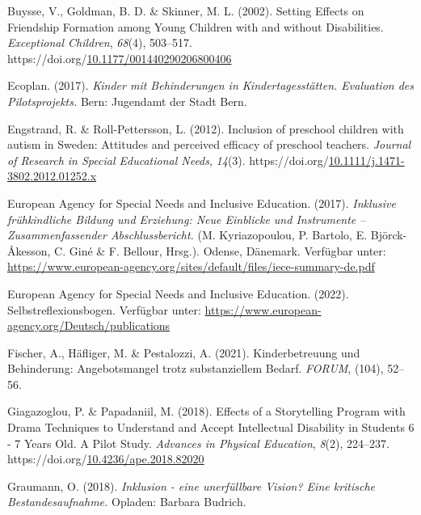 \documentclass[
  ngerman,
  11pt,
  paper=a4,
  twoside,
  titlepage=true,
  openright,
  abstract=on,
  toc=listofnumbered,
  numbers=noenddot,
  chapterprefix=true,
  headings=optiontohead,
  svgnames,
  dvipsnames]{scrreprt}
\newlength{\cslhangindent}
\newlength{\cslentryspacingunit} %
\newenvironment{CSLReferences}[2] %
 {%
  \setlength{\parindent}{0pt}
  \ifodd #1
  \let\oldpar\par
  \def\par{\hangindent=\cslhangindent\oldpar}
  \fi
  \setlength{\parskip}{#2\cslentryspacingunit}
 }%
 {}
\begin{document}
\begin{CSLReferences}{1}{0}
\leavevmode{}%
Buysse, V., Goldman, B. D. \& Skinner, M. L. (2002). Setting Effects on
Friendship Formation among Young Children with and without Disabilities.
\emph{Exceptional Children}, \emph{68}(4), 503–517.
https://doi.org/\href{https://doi.org/10.1177/001440290206800406}{10.1177/001440290206800406}

\leavevmode{}%
Ecoplan. (2017). \emph{Kinder mit Behinderungen in Kindertagesstätten.
Evaluation des Pilotsprojekts.} Bern: Jugendamt der Stadt Bern.

\leavevmode{}%
Engstrand, R. \& Roll-Pettersson, L. (2012). Inclusion of preschool
children with autism in Sweden: Attitudes and perceived efficacy of
preschool teachers. \emph{Journal of Research in Special Educational
Needs}, \emph{14}(3).
https://doi.org/\href{https://doi.org/10.1111/j.1471-3802.2012.01252.x}{10.1111/j.1471-3802.2012.01252.x}

\leavevmode{}%
European Agency for Special Needs and Inclusive Education. (2017).
\emph{Inklusive frühkindliche Bildung und Erziehung: Neue Einblicke und
Instrumente – Zusammenfassender Abschlussbericht.} (M. Kyriazopoulou, P.
Bartolo, E. Björck-Åkesson, C. Giné \& F. Bellour, Hrsg.). Odense,
Dänemark. Verfügbar unter:
\url{https://www.european-agency.org/sites/default/files/iece-summary-de.pdf}

\leavevmode{}%
European Agency for Special Needs and Inclusive Education. (2022).
Selbstreflexionsbogen. Verfügbar unter:
\url{https://www.european-agency.org/Deutsch/publications}

\leavevmode{}%
Fischer, A., Häfliger, M. \& Pestalozzi, A. (2021). Kinderbetreuung und
Behinderung: Angebotsmangel trotz substanziellem Bedarf. \emph{FORUM},
(104), 52–56.

\leavevmode{}%
Giagazoglou, P. \& Papadaniil, M. (2018). Effects of a Storytelling
Program with Drama Techniques to Understand and Accept Intellectual
Disability in Students 6 - 7 Years Old. A Pilot Study. \emph{Advances in
Physical Education}, \emph{8}(2), 224–237.
https://doi.org/\href{https://doi.org/10.4236/ape.2018.82020}{10.4236/ape.2018.82020}

\leavevmode{}%
Graumann, O. (2018). \emph{Inklusion - eine unerfüllbare Vision? Eine
kritische Bestandesaufnahme.} Opladen: Barbara Budrich.


\end{CSLReferences}
\end{document}
